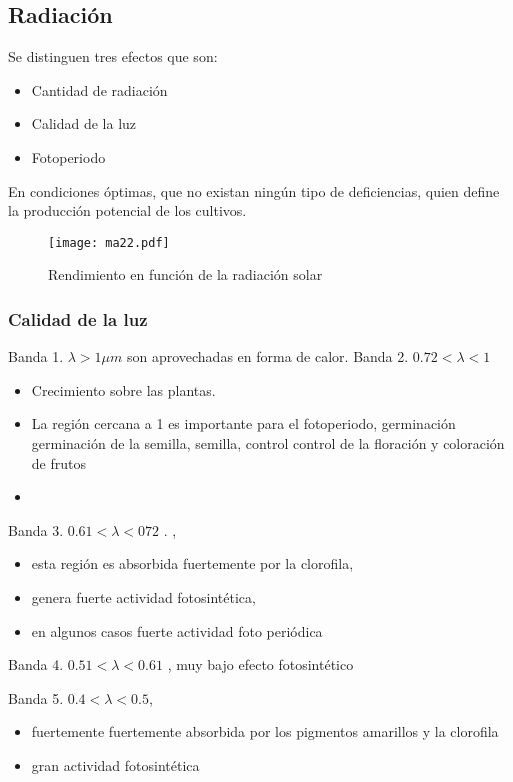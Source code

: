 \subsection{Radiación}
Se distinguen tres efectos que son:
\begin{itemize}
    \item Cantidad de radiación
    \item Calidad de la luz
    \item Fotoperiodo
\end{itemize}
En condiciones óptimas, que no existan ningún tipo de deficiencias, quien define la producción potencial de los cultivos.
\begin{figure}[h!]
\centering
  \texttt{[image: ma22.pdf]}
  \caption{Rendimiento en función de la radiación solar}
  \label{ma22}
\end{figure}

\subsubsection{Calidad de la luz}

Banda 1. $\lambda > 1 \mu m$ son aprovechadas en forma de calor.
Banda 2. $0.72<\lambda<1$
\begin{itemize}
    \item Crecimiento sobre las plantas.
    \item La región cercana a 1 es importante para el fotoperiodo, germinación germinación de la semilla, semilla, control control de la floración y coloración de frutos
    \item 
\end{itemize}
Banda 3. $0.61 < \lambda < 0 72$ . ,
\begin{itemize}
    \item esta región es absorbida fuertemente por la clorofila, 
    \item genera fuerte actividad fotosintética, 
    \item en algunos casos fuerte actividad foto periódica
\end{itemize}
Banda 4. $0.51 < \lambda < 0.61$ , muy bajo efecto fotosintético

Banda 5. $0.4 < \lambda < 0.5$, 
\begin{itemize}
    \item fuertemente fuertemente absorbida por los pigmentos amarillos y la clorofila 
    \item gran actividad fotosintética
\end{itemize}

